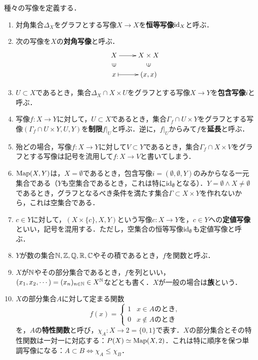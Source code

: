\documentclass[uplatex,dvipdfmx]{jsreport}
\begin{document}
種々の写像を定義する．
\begin{example}\mbox{}
    \begin{enumerate}
        \item 対角集合$\Delta_X$をグラフとする写像$X\to X$を\textbf{恒等写像}$\mathrm{id}_X$と呼ぶ．
        \item 次の写像を$X$の\textbf{対角写像}と呼ぶ．
        \[ \xymatrix@R-2pc{
            X\ar[r]&X\times X\\
            \rotatebox[origin=c]{90}{$\in$}&\rotatebox[origin=c]{90}{$\in$}\\
            x\ar@{|->}[r]&(x,x)
        } \]
        \item $U\subset X$であるとき，集合$\Delta_X\cap X\times U$をグラフとする写像$X\to Y$を\textbf{包含写像}$i$と呼ぶ．
        \item 写像$f:X\to Y$に対して，$U\subset X$であるとき，集合$\Gamma_f\cap U\times Y$をグラフとする写像$(\Gamma_f\cap U\times Y,U,Y)$を\textbf{制限}$f|_U$と呼ぶ．逆に，$f|_U$からみて$f$を\textbf{延長}と呼ぶ．
        \item 殆どの場合，写像$f:X\to Y$に対して$V\subset Y$であるとき，集合$\Gamma_f\cap X\times V$をグラフとする写像は記号を流用して$f:X\to V$と書いてしまう．
        \item $\mathrm{Map}(X,Y)$は，$X=\emptyset$であるとき，包含写像$i=(\emptyset,\emptyset,Y)$のみからなる一元集合である（$Y$も空集合であるとき，これは特に$\mathrm{id}_\emptyset$となる）．$Y=\emptyset\land X\ne\emptyset$であるとき，グラフとなるべき条件を満たす集合$\Gamma\subset X\times Y$を作れないから，これは空集合である．
        \item $c\in Y$に対して，$(X\times\{c\},X,Y)$という写像$c:X\to Y$を，$c\in Y$への\textbf{定値写像}といい，記号を混用する．ただし，空集合の恒等写像$\mathrm{id}_\emptyset$も定値写像と呼ぶ．
        \item $Y$が数の集合$\mathbb{N},\mathbb{Z},\mathbb{Q},\mathbb{R},\mathbb{C}$やその積であるとき，$f$を関数と呼ぶ．
        \item $X$が$\mathbb{N}$やその部分集合であるとき，$f$を列といい，$(x_1,x_2,\cdots)=(x_n)_{n\in\mathbb{N}}\in X^{\mathbb{N}}$などとも書く．$X$が一般の場合は\textbf{族}という．
        \item $X$の部分集合$A$に対して定まる関数\[f(x)=\begin{cases}
            1&x\in Aのとき,\\0&x\notin Aのとき
        \end{cases}\]を，$A$の\textbf{特性関数}と呼び，$\chi_A:X\to 2=\{0,1\}$で表す．$X$の部分集合とその特性関数は一対一に対応する：$P(X)\simeq\mathrm{Map}(X,2)$．これは特に順序を保つ単調写像になる：$A\subset B\Leftrightarrow\chi_A\le\chi_B$．

\end{enumerate}
\end{example}
\end{document}

